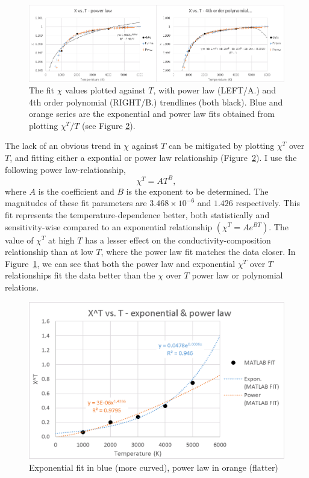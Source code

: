 \begin{figure}[h!]
  \includegraphics[width=\linewidth]{Figures/draft_XT.png}
  \caption[CONTENTS BIT]{The fit $\chi$ values plotted against $T$, with power law (LEFT/A.) and 4th order polynomial (RIGHT/B.) trendlines (both black). Blue and orange series are the exponential and power law fits obtained from plotting $\chi^T/T$ (see Figure \ref{fig:draft_xtt}).}
  \label{fig:draft_xt}
\end{figure}

The lack of an obvious trend in $\chi$ against $T$ can be mitigated by plotting $\chi^T$ over $T$, and fitting either a expontial or power law relationship (Figure~\ref{fig:draft_xtt}). I use the following power law-relationship, 
%
\begin{equation}%
\chi^{T}=A T^{B},
\label{eq.chi_scale}
\end{equation}%
%
where $A$ is the coefficient and $B$ is the exponent to be determined. The magnitudes of these fit parameters are $3.468 \times 10^{-6}$ and $1.426$ respectively. This fit represents the temperature-dependence better, both statistically and sensitivity-wise compared to an exponential relationship $\left ( \chi^{T}=A e^{BT}\right )$. The value of $\chi^T$ at high $T$ has a lesser effect on the conductivity-composition relationship than at low $T$, where the power law fit matches the data closer. In Figure~\ref{fig:draft_xt}, we can see that both the power law and exponential $\chi^T$ over $T$ relationships fit the data better than the $\chi$ over $T$ power law or polynomial relations.

\begin{figure}[h]
  \includegraphics[width=\linewidth]{Figures/draft_XTT.png}
  \caption[CONTENTS BIT]{Exponential fit in blue (more curved), power law in orange (flatter)}
  \label{fig:draft_xtt}
\end{figure}



